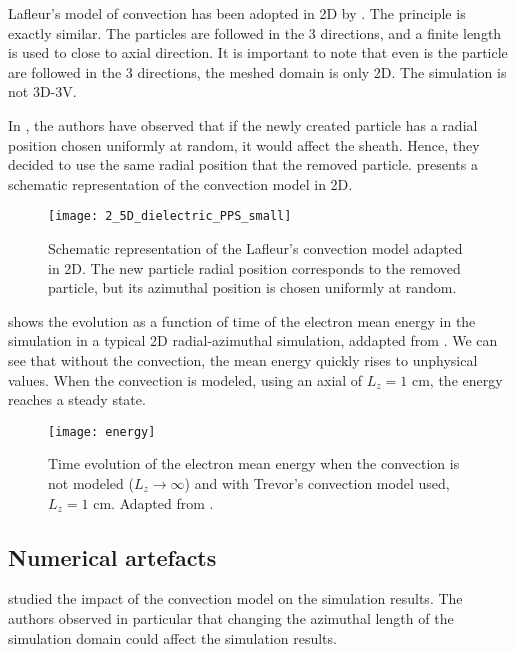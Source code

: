     Lafleur's model of convection has been adopted in \ac{2D} by \citet{croes2017a}.
    The principle is exactly similar.
    The particles are followed in the 3 directions, and a finite length is used to close to axial direction.
    It is important to note that even is the particle are followed in the 3 directions, the meshed domain is only \ac{2D}.
    The simulation is not \ac{3D}-\ac{3V}.

    In \citet{croes2017a}, the authors have observed that if the newly created particle has a radial position chosen uniformly at random, it would affect the sheath.
    Hence, they decided to use the same radial position that the removed particle.
     presents a schematic representation of the convection model in \ac{2D}.

    \begin{figure}[hbtp]
      \centering
      \texttt{[image: 2\_5D\_dielectric\_PPS\_small]}
      \caption{Schematic representation of the Lafleur's convection model adapted in \ac{2D}. The new particle radial position corresponds to the removed particle, but its azimuthal position is chosen uniformly at random. }
      \label{fig-Fake_2d}
    \end{figure}

     shows the evolution as a function of time of the electron mean energy in the simulation in a typical \ac{2D} radial-azimuthal simulation, addapted from \citet{croes2017}.
    We can see that without the convection, the mean energy quickly rises to unphysical values.
    When the convection is modeled, using an axial of $L_z=1$ cm, the energy reaches a steady state.
    \begin{figure}[hbtp]
      \centering
      \texttt{[image: energy]}
      \caption{Time evolution of the electron mean energy when the convection is not modeled ($L_z \rightarrow \infty$) and with Trevor's convection model used, $L_z = 1$ cm. Adapted from \citet{croes2017}.}
      \label{fig-energy_convection}
    \end{figure}



  \subsection{Numerical artefacts}
    \citet{lafleur2016a} studied the impact of the convection model on the simulation results.
    The authors observed in particular that changing the azimuthal length of the simulation domain could affect the simulation results.

